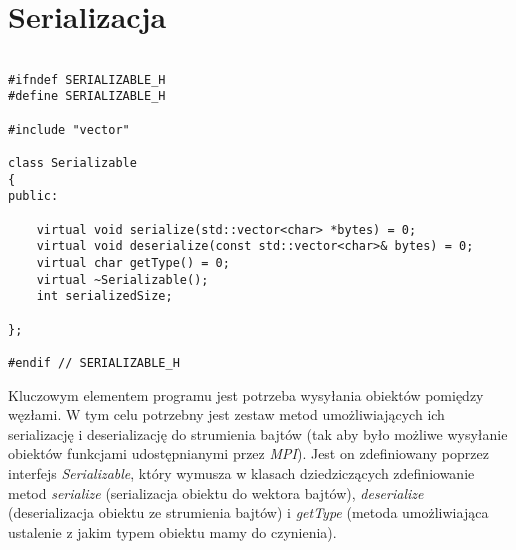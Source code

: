 \section{Serializacja}

\begin{lstlisting}[caption={Interfejs \emph{Serializable}}]

#ifndef SERIALIZABLE_H
#define SERIALIZABLE_H

#include "vector"

class Serializable
{
public:

    virtual void serialize(std::vector<char> *bytes) = 0;
    virtual void deserialize(const std::vector<char>& bytes) = 0;
    virtual char getType() = 0;
    virtual ~Serializable();
    int serializedSize;

};

#endif // SERIALIZABLE_H

\end{lstlisting}

Kluczowym elementem programu jest potrzeba wysyłania obiektów pomiędzy węzłami. W tym celu potrzebny jest zestaw metod umożliwiających ich serializację i deserializację do strumienia bajtów (tak aby było możliwe wysyłanie obiektów funkcjami udostępnianymi przez \emph{MPI}). Jest on zdefiniowany poprzez interfejs \emph{Serializable}, który wymusza w klasach dziedziczących zdefiniowanie metod \emph{serialize} (serializacja obiektu do wektora bajtów), \emph{deserialize} (deserializacja obiektu ze strumienia bajtów) i \emph{getType} (metoda umożliwiająca ustalenie z jakim typem obiektu mamy do czynienia).
